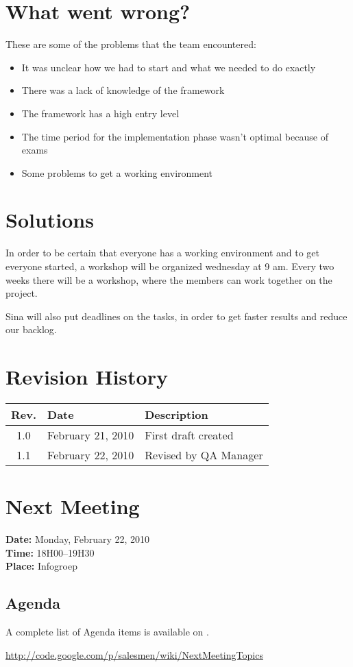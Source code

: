 \documentclass[a4paper, 12pt]{article}
\begin{document}
\section{What went wrong?}
	These are some of the problems that the team encountered:
	\begin{itemize}
		\item It was unclear how we had to start and what we needed to do exactly
		\item There was a lack of knowledge of the framework
		\item The framework has a high entry level
		\item The time period for the implementation phase wasn't optimal because of exams
		\item Some problems to get a working environment
	\end{itemize}

\section{Solutions}
	In order to be certain that everyone has a working environment and to get everyone started, a workshop will be organized wednesday at 9 am. Every two weeks there will be a workshop, where the members can work together on the project.
	
	Sina will also put deadlines on the tasks, in order to get faster results and reduce our backlog.
			
\section{Revision History}
	\begin{tabular}{c | l | l }
		\textbf{Rev.} & \textbf{Date} & \textbf{Description} \\
		\hline
		1.0 & February 21, 2010 & First draft created \\
		1.1 & February 22, 2010 & Revised by QA Manager \\
	\end{tabular}		
			
			
\section{Next Meeting}

	\textbf{Date:} Monday, February 22, 2010\\
	\textbf{Time:} 18H00--19H30\\
	\textbf{Place:} Infogroep\\
	
	\subsection{Agenda}
A complete list of Agenda items is available on \cite{agendaitems}.\\
	
	\begin{thebibliography}{99}
		
		\href{http://code.google.com/p/salesmen/wiki/NextMeetingTopics}{http://code.google.com/p/salesmen/wiki/NextMeetingTopics}
		
	\end{thebibliography}	
		
\end{document}
